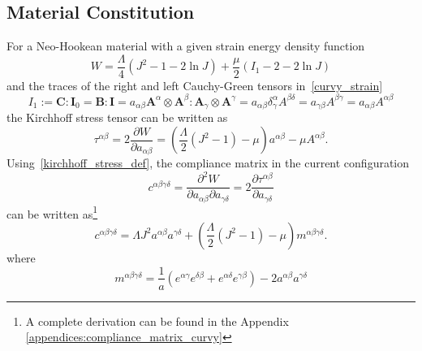 \documentclass[../main.tex]{subfiles}
\begin{document}
\subsection{Material Constitution}
For a Neo-Hookean material with a given strain energy density function
\begin{equation}\label{eq:NH_strain}
    W = \frac{\Lambda}{4} \left( J^{2} - 1 - 2 \ln{J} \right) + \frac{\mu}{2} \left( I_{1} - 2 - 2 \ln{J} \right) 
\end{equation}
%
and the traces of the right and left Cauchy-Green tensors in~\eqref{curvy_strain}
\begin{equation}\label{eq:CGtrace}
    I_{1} := \boldsymbol{C} : \boldsymbol{I}_{0} = \boldsymbol{B} : \boldsymbol{I} = a_{\alpha \beta} \boldsymbol{A}^{\alpha} \otimes \boldsymbol{A}^{\beta} : \boldsymbol{A}_{\gamma} \otimes \boldsymbol{A}^{\gamma} = a_{\alpha \beta} \delta^{\alpha}_{\gamma} A^{\beta \delta} = a_{\gamma \beta} A^{\beta \gamma} = a_{\alpha \beta} A^{\alpha \beta}
\end{equation}
the Kirchhoff stress tensor can be written as 
\begin{equation}\label{kirchhoff_stress_def}
        \tau^{\alpha \beta} = 2 \frac{\partial W}{\partial a_{\alpha \beta}} = \left( \frac{\Lambda}{2} \left( J^{2} - 1 \right) - \mu \right) a^{\alpha \beta} - \mu A^{\alpha \beta}.
\end{equation}
Using~\eqref{kirchhoff_stress_def}, the compliance matrix in the current configuration
\begin{equation}\label{curvy_compliance_current_def}
    c^{\alpha \beta \gamma \delta} = \frac{\partial^{2} W}{\partial a_{\alpha \beta} \partial a_{\gamma \delta}} = 2 \frac{\partial \tau^{\alpha \beta}}{\partial a_{\gamma \delta}}
\end{equation}
%
can be written as\footnote{A complete derivation can be found in the Appendix \ref{appendices:compliance_matrix_curvy}}
\begin{equation}\label{curvy_compliance_current}
        c^{\alpha \beta \gamma \delta} = \Lambda J^{2} a^{\alpha \beta} a^{\gamma \delta} + \left( \frac{\Lambda}{2} \left( J^{2} - 1 \right) - \mu \right) m^{\alpha \beta \gamma \delta}.
\end{equation}
where
\begin{equation} \label{mabgd}
    m^{\alpha \beta \gamma \delta} = \frac{1}{a} \left( e^{\alpha \gamma} e^{\delta \beta} + e^{\alpha \delta} e^{\gamma \beta} \right) - 2 a^{\alpha \beta} a^{\gamma \delta}
\end{equation}
%
%
\end{document}
